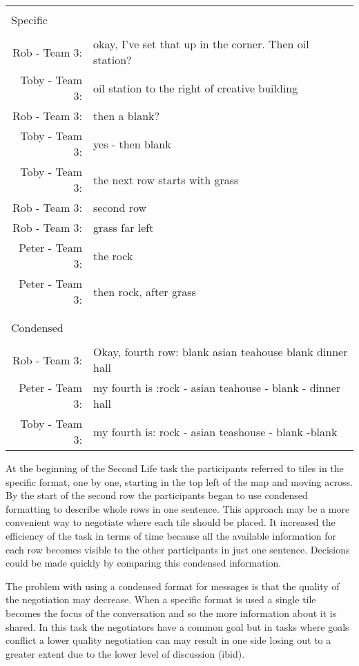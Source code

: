 \documentclass{acm_proc_article-sp}
\begin{document}
\begin{tabularx}{0.45\textwidth}{rX}
\hline \\ [-2ex]
	\multicolumn{2}{l}{Specific} \\ 
\hline \\ [-1.5ex]
	Rob - Team 3: & okay, I've set that up in the corner. \newline Then oil station?\\
	Toby - Team 3: & oil station to the right of creative building\\
	Rob - Team 3: & then a blank?\\
	Toby - Team 3: & yes - then blank\\
	Toby - Team 3: & the next row starts with grass\\
	Rob - Team 3: & second row\\
	Rob - Team 3: & grass far left\\
	Peter - Team 3: & the rock\\
	Peter - Team 3: & then rock, after grass\\
	\\ [-1.5ex]
\hline \\ [-1.5ex]
	\multicolumn{2}{l}{Condensed} \\ 
\hline \\ [-2ex]
	Rob - Team 3: & Okay, fourth row: blank asian teahouse blank dinner hall\\
	Peter - Team 3: & my fourth is :rock - asian teahouse - blank - dinner hall\\
	Toby - Team 3: & my fourth is: rock - asian teashouse - blank -blank
\end{tabularx}






At the beginning of the Second Life task the participants referred to tiles in the specific format, one by one, starting in the top left of the map and moving across. By the start of the second row the participants began to use condensed formatting to describe whole rows in one sentence. This approach may be a more convenient way to negotiate where each tile should be placed. It increased the efficiency of the task in terms of time because all the available information for each row becomes visible to the other participants in just one sentence. Decisions could be made quickly by comparing this condensed information.

The problem with using a condensed format for messages is that the quality of the negotiation may decrease. When a specific format is used a single tile becomes the focus of the conversation and so the more information about it is shared. In this task the negotiators have a common goal but in tasks where goals conflict a lower quality negotiation can may result in one side losing out to a greater extent due to the lower level of discussion (ibid).
\end{document}
